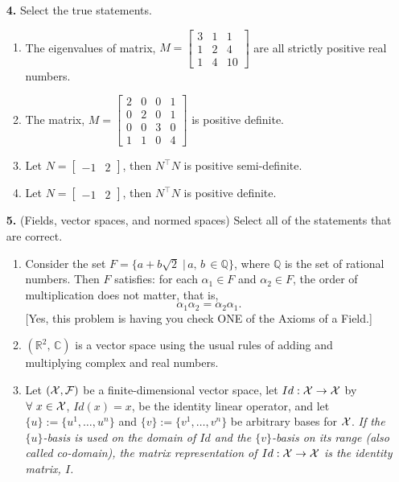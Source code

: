 \documentclass[letterpaper]{article}
\newcommand{\real}{\mathbb R}  %
\newcommand{\cp}{\mathbb C}    %
\begin{document}
\begin{enumerate}
\item[{\bf 4.}] Select the true statements.
\begin{enumerate}
\setlength{\itemsep}{.15in}
\renewcommand{\labelenumi}{(\alph{enumi})}
\setlength{\itemsep}{.1in}
\item The eigenvalues of matrix, $M = \begin{bmatrix}3 & 1 & 1 \\1 &2 &4 \\ 1 &4 &10  \end{bmatrix} $ are all strictly positive real numbers.
\item The matrix, $M = \begin{bmatrix}2 & 0 & 0 & 1 \\0  &2 &0 & 1 \\ 0  & 0  &3 & 0\\ 1 & 1 & 0 &4 \end{bmatrix} $ is positive definite.
\item Let $N = \begin{bmatrix} -1  & 2  \end{bmatrix}$, then  $N^\top N$ is positive semi-definite.
\item Let $N = \begin{bmatrix} -1  & 2  \end{bmatrix}$, then $N^\top N $ is positive definite.
\end{enumerate}



\newpage
\item[{\bf 5.}] (Fields, vector spaces, and normed spaces) Select all of the statements that are correct.
\begin{enumerate}
\setlength{\itemsep}{.15in}
\renewcommand{\labelenumi}{(\alph{enumi})}
\setlength{\itemsep}{.1in}

\item Consider the set $F=\{a+b\sqrt{2}\;|\, a,\, b\,\in \mathbb{Q}\}$, where $\mathbb{Q}$ is the set of rational numbers. Then $F$ satisfies: for each $\alpha_1 \in F$ and $\alpha_2 \in F$, the order of multiplication does not matter, that is,
     $$\alpha_1 \alpha_2 = \alpha_2 \alpha_1. $$
 [Yes, this problem is having you check ONE of the Axioms of a Field.]

\item $(\real^{2},\, \cp)$ is a vector space using the usual rules of adding and multiplying complex and real numbers.

\item Let ${\cal (X,F)}$ be a finite-dimensional vector space, let $Id:{\cal X} \to {\cal X}$ by $\forall~x\in {\cal X}$, $Id(x)=x$, be the identity linear operator, and let $ \{u \} :=\{ u^1, \ldots, u^n \} $ and $\{v \}:=\{v^1, \ldots, v^n
\}$ be arbitrary bases for $ {\cal X}$.  \textit{If the $ \{u \}$-basis is used on the domain of $Id$ and the $ \{v \}$-basis on its range (also called co-domain), the matrix representation of $Id:{\cal X} \to {\cal X}$ is the identity matrix, $I$.}


\end{enumerate}
\end{enumerate}
\end{document}
